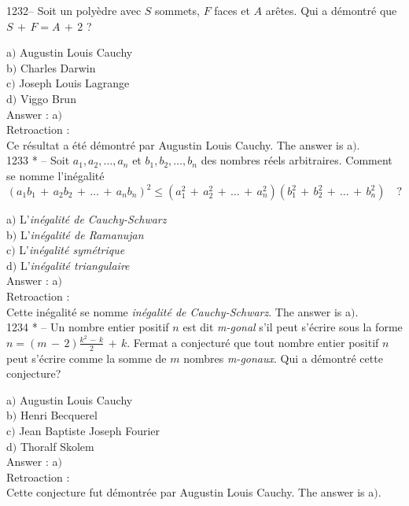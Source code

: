 ﻿\documentclass[letterpaper, 12pt]{article}
\begin{document}
1232-- Soit un poly\`edre avec $S$ sommets, $F$ faces et $A$
ar\^etes. Qui a d\'emontr\'e que $S\,+\,F=A\,+\,2$ ?

a$)$ Augustin Louis Cauchy \\
b$)$ Charles Darwin \\
c$)$ Joseph Louis Lagrange \\
d$)$ Viggo Brun\\

Answer : a$)$\\

Retroaction : \\
Ce r\'esultat a \'et\'e d\'emontr\'e par Augustin Louis Cauchy.
The answer is a$)$.\\

1233 * -- Soit $a_1,a_2,\ldots,a_n$ et $b_1,b_2,\ldots,b_n$ des nombres
r\'eels arbitraires. Comment se nomme l'in\'egalit\'e
$$(a_1b_1\,+\,a_2b_2\,+\,\ldots\,+\,a_nb_n)^2\le(a_1^2\,+\,a_2^2\,+\,\ldots\,+\,a_n^2)(b_1^2\,+\,b_2^2\,+\,\ldots\,+\,b_n^2)\quad?$$

a$)$ L'{\sl in\'egalit\'e de Cauchy-Schwarz} \\
b$)$ L'{\sl in\'egalit\'e de Ramanujan} \\
c$)$ L'{\sl in\'egalit\'e sym\'etrique} \\
d$)$ L'{\sl in\'egalit\'e triangulaire}\\

Answer : a$)$\\

Retroaction : \\
Cette in\'egalit\'e se nomme {\sl in\'egalit\'e de Cauchy-Schwarz}.
The answer is a$)$.\\

1234 * -- Un nombre entier positif $n$ est dit {\sl m-gonal} s'il
peut s'\'ecrire sous la forme
$\displaystyle{n=(m\,-\,2)\frac{k^2\,-\,k}2\,+\,k}$. Fermat a
conjectur\'e que tout nombre entier positif $n$ peut s'\'ecrire
comme la somme de $m$ nombres {\sl m-gonaux}. Qui a d\'emontr\'e
cette conjecture?

a$)$ Augustin Louis Cauchy \\
b$)$ Henri Becquerel \\
c$)$ Jean Baptiste Joseph Fourier \\
d$)$ Thoralf Skolem\\

Answer : a$)$\\

Retroaction : \\
Cette conjecture fut d\'emontr\'ee par Augustin Louis Cauchy.
The answer is a$)$.\\
\end{document}
